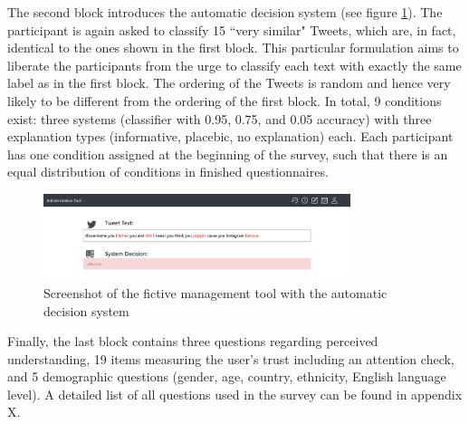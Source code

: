 The second block introduces the automatic decision system (see figure \ref{fig:survey_tools2}). The participant is again asked to classify 15 ``very similar" Tweets, which are, in fact, identical to the ones shown in the first block. This particular formulation aims to liberate the participants from the urge to classify each text with exactly the same label as in the first block. The ordering of the Tweets is random and hence very likely to be different from the ordering of the first block. In total, 9 conditions exist: three systems (classifier with 0.95, 0.75, and 0.05 accuracy) with three explanation types (informative, placebic, no explanation) each. Each participant has one condition assigned at the beginning of the survey, such that there is an equal distribution of conditions in finished questionnaires. \newline
\begin{figure} [H]
	\centering
	\includegraphics[width=0.8\textwidth]{img/pg_5_13.PNG}
	\caption{Screenshot of the fictive management tool with the automatic decision system}
	\label{fig:survey_tools2}
\end{figure}
Finally, the last block contains three questions regarding perceived understanding, 19 items measuring the user's trust including an attention check, and 5 demographic questions (gender, age, country, ethnicity, English language level).\newline
A detailed list of all questions used in the survey can be found in appendix {\color{red}X}.


